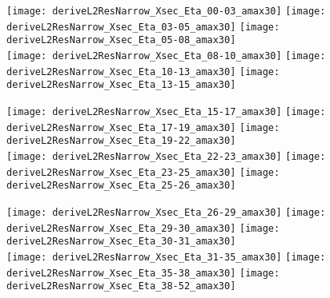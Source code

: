 \documentclass[landscape,10pt]{beamer} %
\begin{document}
\newpage
\begin{figure}[p]
\centering
  \texttt{[image: deriveL2ResNarrow\_Xsec\_Eta\_00-03\_amax30]}
  \texttt{[image: deriveL2ResNarrow\_Xsec\_Eta\_03-05\_amax30]}
  \texttt{[image: deriveL2ResNarrow\_Xsec\_Eta\_05-08\_amax30]}
\\
  \texttt{[image: deriveL2ResNarrow\_Xsec\_Eta\_08-10\_amax30]}
  \texttt{[image: deriveL2ResNarrow\_Xsec\_Eta\_10-13\_amax30]}
  \texttt{[image: deriveL2ResNarrow\_Xsec\_Eta\_13-15\_amax30]}
\end{figure}
\newpage
\begin{figure}[p]
\centering
  \texttt{[image: deriveL2ResNarrow\_Xsec\_Eta\_15-17\_amax30]}
  \texttt{[image: deriveL2ResNarrow\_Xsec\_Eta\_17-19\_amax30]}
  \texttt{[image: deriveL2ResNarrow\_Xsec\_Eta\_19-22\_amax30]}
\\
  \texttt{[image: deriveL2ResNarrow\_Xsec\_Eta\_22-23\_amax30]}
  \texttt{[image: deriveL2ResNarrow\_Xsec\_Eta\_23-25\_amax30]}
  \texttt{[image: deriveL2ResNarrow\_Xsec\_Eta\_25-26\_amax30]}
\end{figure}
\newpage
\begin{figure}[p]
\centering
  \texttt{[image: deriveL2ResNarrow\_Xsec\_Eta\_26-29\_amax30]}
  \texttt{[image: deriveL2ResNarrow\_Xsec\_Eta\_29-30\_amax30]}
  \texttt{[image: deriveL2ResNarrow\_Xsec\_Eta\_30-31\_amax30]}
\\
  \texttt{[image: deriveL2ResNarrow\_Xsec\_Eta\_31-35\_amax30]}
  \texttt{[image: deriveL2ResNarrow\_Xsec\_Eta\_35-38\_amax30]}
  \texttt{[image: deriveL2ResNarrow\_Xsec\_Eta\_38-52\_amax30]}
\end{figure}
\end{document}
